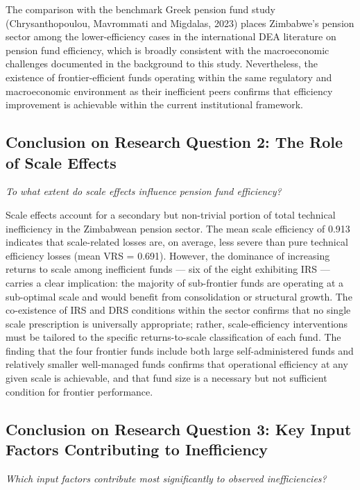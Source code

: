 \documentclass[12pt,a4paper]{article}
\begin{document}
The comparison with the benchmark Greek pension fund study (Chrysanthopoulou, Mavrommati and Migdalas, 2023) places Zimbabwe's pension sector among the lower-efficiency cases in the international DEA literature on pension fund efficiency, which is broadly consistent with the macroeconomic challenges documented in the background to this study. Nevertheless, the existence of frontier-efficient funds operating within the same regulatory and macroeconomic environment as their inefficient peers confirms that efficiency improvement is achievable within the current institutional framework.

\subsection{Conclusion on Research Question 2: The Role of Scale Effects}

\textit{To what extent do scale effects influence pension fund efficiency?}

Scale effects account for a secondary but non-trivial portion of total technical inefficiency in the Zimbabwean pension sector. The mean scale efficiency of 0.913 indicates that scale-related losses are, on average, less severe than pure technical efficiency losses (mean VRS = 0.691). However, the dominance of increasing returns to scale among inefficient funds --- six of the eight exhibiting IRS --- carries a clear implication: the majority of sub-frontier funds are operating at a sub-optimal scale and would benefit from consolidation or structural growth. The co-existence of IRS and DRS conditions within the sector confirms that no single scale prescription is universally appropriate; rather, scale-efficiency interventions must be tailored to the specific returns-to-scale classification of each fund. The finding that the four frontier funds include both large self-administered funds and relatively smaller well-managed funds confirms that operational efficiency at any given scale is achievable, and that fund size is a necessary but not sufficient condition for frontier performance.

\subsection{Conclusion on Research Question 3: Key Input Factors Contributing to Inefficiency}

\textit{Which input factors contribute most significantly to observed inefficiencies?}
\end{document}
